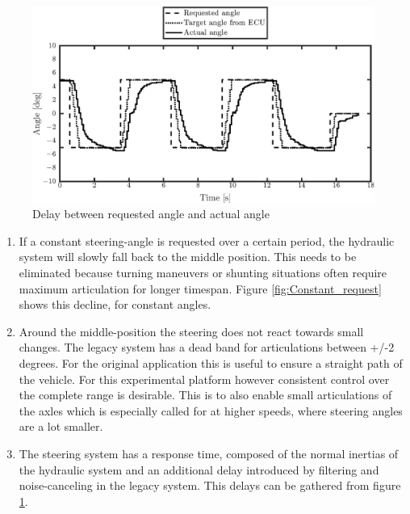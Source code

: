 \documentclass[root.tex]{subfiles}
\begin{document}
	\begin{figure}[!h]
		
		\includegraphics[width=1\linewidth]{Step_input_request}
		\caption[Delay between requested and actual angle]{Delay between requested angle and actual angle}
		
		\label{fig:Step_input_request}
	\end{figure}
	\begin{enumerate}
		\item If a constant steering-angle is requested over a certain period, the hydraulic system will slowly fall back to the middle position. This needs to be eliminated because turning maneuvers or shunting situations often require maximum articulation for longer timespan. Figure \ref{fig:Constant_request} shows this decline, for constant angles.
		
		
		
		\item Around the middle-position the steering does not react towards small changes. The legacy system has a dead band for articulations between +/-2 degrees. For the original application this is useful to ensure a straight path of the vehicle. For this experimental platform however consistent control over the complete range is desirable. This is to also enable small articulations of the axles which is especially called for at higher speeds, where steering angles are a lot smaller. 
		
		\item The steering system has a response time, composed of the normal inertias of the hydraulic system and an additional delay introduced by filtering and noise-canceling in the legacy system. This delays can be gathered from figure \ref{fig:Step_input_request}.
		
		
		
	\end{enumerate}
\end{document}

